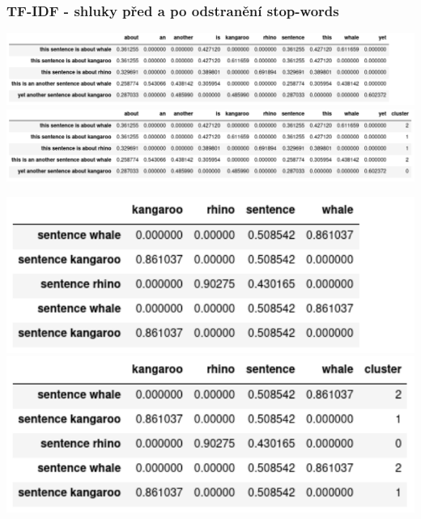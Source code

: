 \documentclass{beamer}
\begin{document}
\begin{frame}
\frametitle{TF-IDF - shluky před a po odstranění stop-words}

  \vspace{20pt}
  \begin{overprint}
    \centering\includegraphics[width=\textwidth,height=\textheight,keepaspectratio]{figures/whale_vectorized.pdf}
    \centering\includegraphics[width=\textwidth,height=\textheight,keepaspectratio]{figures/whale_vectorized_clust.pdf}
  \end{overprint}
  \vspace{20pt}
  \begin{overprint}
    \centering\includegraphics[width=.5\textwidth,height=\textheight,keepaspectratio]{figures/whale_stopwords.pdf}
    \centering\includegraphics[width=.5\textwidth,height=\textheight,keepaspectratio]{figures/whale_stopwords_clust.pdf}
  \end{overprint}

\end{frame}
\end{document}
